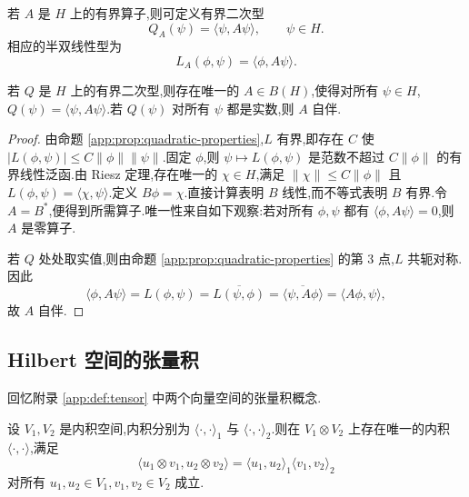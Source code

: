\begin{example}[由有界算子构造二次型]\label{app:ex:operator-quadratic}
若 \(A\) 是 \(H\) 上的有界算子,则可定义有界二次型
\[
Q_A(\psi)=\langle\psi,A\psi\rangle,\qquad\psi\in H.
\]
相应的半双线性型为
\[
L_A(\phi,\psi)=\langle\phi,A\psi\rangle.
\]
\end{example}

\begin{proposition}[二次型的算子表示]\label{app:prop:quadratic-operator}
若 \(Q\) 是 \(H\) 上的有界二次型,则存在唯一的 \(A\in B(H)\),使得对所有 \(\psi\in H\),\(Q(\psi)=\langle\psi,A\psi\rangle\).若 \(Q(\psi)\) 对所有 \(\psi\) 都是实数,则 \(A\) 自伴.
\end{proposition}

\begin{proof}
由命题 \ref{app:prop:quadratic-properties},\(L\) 有界,即存在 \(C\) 使 \(|L(\phi,\psi)|\le C\|\phi\|\|\psi\|\).固定 \(\phi\),则 \(\psi\mapsto L(\phi,\psi)\) 是范数不超过 \(C\|\phi\|\) 的有界线性泛函.由 Riesz 定理,存在唯一的 \(\chi\in H\),满足 \(\|\chi\|\le C\|\phi\|\) 且 \(L(\phi,\psi)=\langle\chi,\psi\rangle\).定义 \(B\phi=\chi\).直接计算表明 \(B\) 线性,而不等式表明 \(B\) 有界.令 \(A=B^*\),便得到所需算子.唯一性来自如下观察:若对所有 \(\phi,\psi\) 都有 \(\langle\phi,A\psi\rangle=0\),则 \(A\) 是零算子.

若 \(Q\) 处处取实值,则由命题 \ref{app:prop:quadratic-properties} 的第 3 点,\(L\) 共轭对称.因此
\[
\langle\phi,A\psi\rangle=L(\phi,\psi)=\overline{L(\psi,\phi)}
=\overline{\langle\psi,A\phi\rangle}=\langle A\phi,\psi\rangle,
\]
故 \(A\) 自伴.
\end{proof}

\subsection{Hilbert 空间的张量积}\label{app:subsec:hilbert-tensor}

回忆附录 \ref{app:def:tensor} 中两个向量空间的张量积概念.

\begin{proposition}[内积的张量积]\label{app:prop:inner-tensor}
设 \(V_1,V_2\) 是内积空间,内积分别为 \(\langle\cdot,\cdot\rangle_1\) 与 \(\langle\cdot,\cdot\rangle_2\).则在 \(V_1\otimes V_2\) 上存在唯一的内积 \(\langle\cdot,\cdot\rangle\),满足
\[
\langle u_1\otimes v_1,u_2\otimes v_2\rangle
=\langle u_1,u_2\rangle_1\langle v_1,v_2\rangle_2
\]
对所有 \(u_1,u_2\in V_1,v_1,v_2\in V_2\) 成立.
\end{proposition}

